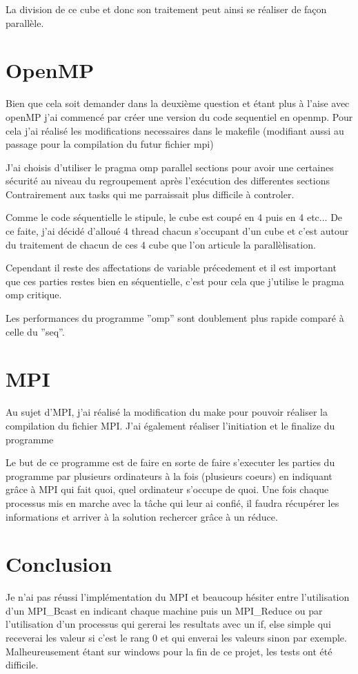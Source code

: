 \documentclass{article}
\begin{document}
La division de ce cube et donc son traitement peut ainsi se réaliser de façon parallèle. 
\vspace{1cm}

\section{OpenMP}

Bien que cela soit demander dans la deuxième question et étant plus à l'aise avec openMP j'ai commencé par créer une version du code sequentiel en openmp.
Pour cela j'ai réalisé les modifications necessaires dans le makefile (modifiant aussi au passage pour la compilation du futur fichier mpi)

J'ai choisis d'utiliser le pragma omp parallel sections pour avoir une certaines sécurité au niveau du regroupement après l'exécution des differentes sections
Contrairement aux tasks qui me parraissait plus difficile à controler.

Comme le code séquentielle le stipule, le cube est coupé en 4 puis en 4 etc...
De ce faite, j'ai décidé d'alloué 4 thread chacun s'occupant d'un cube et c'est autour du traitement de chacun de ces 4 cube que l'on articule la parallèlisation.

Cependant il reste des affectations de variable précedement et il est important que ces parties restes bien en séquentielle, c'est pour cela que j'utilise le pragma omp critique.

Les performances du programme ''omp'' sont doublement plus rapide comparé à celle du ''seq''.


\section{MPI}

Au sujet d'MPI, j'ai réalisé la modification du make pour pouvoir réaliser la compilation du fichier MPI.
J'ai également réaliser l'initiation et le finalize du programme

Le but de ce programme est de faire en sorte de faire s'executer les parties du programme par plusieurs ordinateurs à la fois (plusieurs coeurs) en indiquant grâce à MPI qui fait quoi, quel ordinateur s'occupe de quoi.
Une fois chaque processus mis en marche avec la tâche qui leur ai confié, il faudra récupérer les informations et arriver à la solution rechercer grâce à un réduce.


\section{Conclusion}

Je n'ai pas réussi l'implémentation du MPI et beaucoup hésiter entre l'utilisation d'un MPI\_Bcast en indicant chaque machine puis un MPI\_Reduce ou par l'utilisation d'un processus qui gererai les resultats avec un if, else simple qui receverai les valeur si c'est le rang 0 et qui enverai les valeurs sinon par exemple.
Malheureusement étant sur windows pour la fin de ce projet, les tests ont été difficile.
\end{document}
